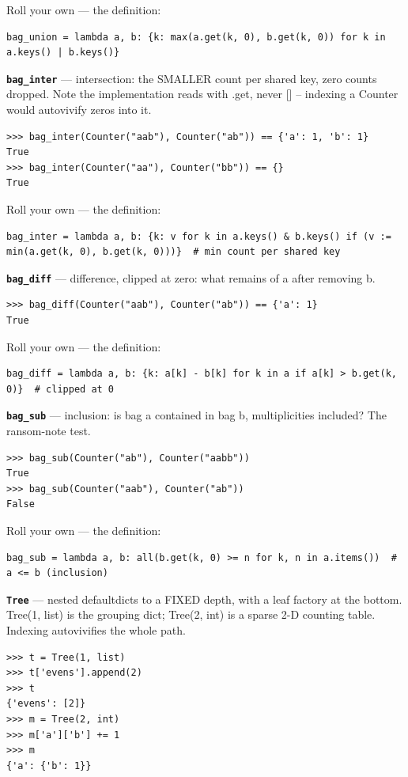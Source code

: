 \documentclass[10pt,letterpaper]{article}
\begin{document}
Roll your own --- the definition:

\begin{lstlisting}[style=ex]
bag_union = lambda a, b: {k: max(a.get(k, 0), b.get(k, 0)) for k in a.keys() | b.keys()}
\end{lstlisting}
\textbf{\texttt{bag\_inter}} --- intersection: the SMALLER count per shared key, zero counts dropped. Note the implementation reads with .get, never [] -- indexing a Counter would autovivify zeros into it.
\begin{lstlisting}[style=ex]
>>> bag_inter(Counter("aab"), Counter("ab")) == {'a': 1, 'b': 1}
True
>>> bag_inter(Counter("aa"), Counter("bb")) == {}
True
\end{lstlisting}

Roll your own --- the definition:

\begin{lstlisting}[style=ex]
bag_inter = lambda a, b: {k: v for k in a.keys() & b.keys() if (v := min(a.get(k, 0), b.get(k, 0)))}  # min count per shared key
\end{lstlisting}
\textbf{\texttt{bag\_diff}} --- difference, clipped at zero: what remains of a after removing b.
\begin{lstlisting}[style=ex]
>>> bag_diff(Counter("aab"), Counter("ab")) == {'a': 1}
True
\end{lstlisting}

Roll your own --- the definition:

\begin{lstlisting}[style=ex]
bag_diff = lambda a, b: {k: a[k] - b[k] for k in a if a[k] > b.get(k, 0)}  # clipped at 0
\end{lstlisting}
\textbf{\texttt{bag\_sub}} --- inclusion: is bag a contained in bag b, multiplicities included? The ransom-note test.
\begin{lstlisting}[style=ex]
>>> bag_sub(Counter("ab"), Counter("aabb"))
True
>>> bag_sub(Counter("aab"), Counter("ab"))
False
\end{lstlisting}

Roll your own --- the definition:

\begin{lstlisting}[style=ex]
bag_sub = lambda a, b: all(b.get(k, 0) >= n for k, n in a.items())  # a <= b (inclusion)
\end{lstlisting}
\textbf{\texttt{Tree}} --- nested defaultdicts to a FIXED depth, with a leaf factory at the bottom. Tree(1, list) is the grouping dict; Tree(2, int) is a sparse 2-D counting table. Indexing autovivifies the whole path.
\begin{lstlisting}[style=ex]
>>> t = Tree(1, list)
>>> t['evens'].append(2)
>>> t
{'evens': [2]}
>>> m = Tree(2, int)
>>> m['a']['b'] += 1
>>> m
{'a': {'b': 1}}
\end{lstlisting}
\end{document}

